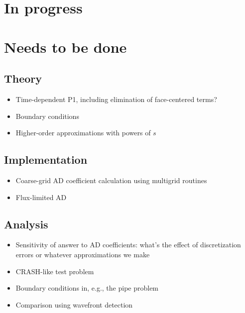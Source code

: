 \documentclass[11pt]{SRJresearch}
\begin{document}
\section{In progress}

\section{Needs to be done}

\subsection{Theory}
\begin{itemize}
  \item Time-dependent P1, including elimination of face-centered terms?
  \item Boundary conditions
  \item Higher-order approximations with powers of $s$
\end{itemize}

\subsection{Implementation}
\begin{itemize}
  \item Coarse-grid AD coefficient calculation using multigrid routines
  \item Flux-limited AD
\end{itemize}

\subsection{Analysis}
\begin{itemize}
  \item Sensitivity of answer to AD coefficients: what's the effect of
    discretization errors or whatever approximations we make
  \item CRASH-like test problem
  \item Boundary conditions in, e.g., the pipe problem
  \item Comparison using wavefront detection
\end{itemize}


\end{document}
